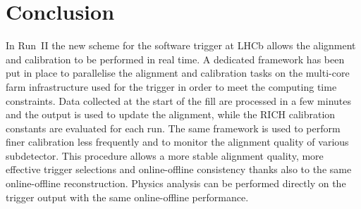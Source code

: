 \section{Conclusion}
In Run~II the new scheme for the software trigger at LHCb allows the
alignment and calibration to be performed in real time. A dedicated framework
has been put in place to parallelise the alignment and calibration tasks
on the multi-core farm infrastructure used for the trigger in order to meet the
computing time constraints. Data collected
at the start of the fill are processed in a few minutes and the output is used to
update the alignment, while the RICH calibration constants are evaluated for
each run. The same framework is used to perform  finer calibration less
frequently and to monitor the alignment quality of various subdetector. 
This procedure allows a
more stable alignment quality, more effective trigger selections and
online-offline consistency thanks also to the same online-offline reconstruction.
Physics analysis can be performed directly on the trigger output with the same online-offline performance.

